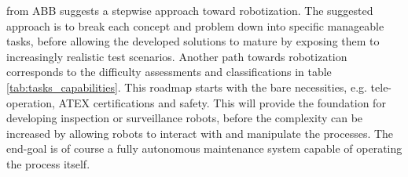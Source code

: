 \cite{StepwiseApproachToRobotics} from ABB suggests a stepwise approach toward robotization. The suggested approach is to break each concept and problem down into specific manageable tasks, before allowing the developed solutions to mature by exposing them to increasingly realistic test scenarios. Another path towards robotization corresponds to the difficulty assessments and classifications in table \ref{tab:tasks_capabilities}\cite{graf2008mobile}. This roadmap starts with the bare necessities, e.g. tele-operation, ATEX certifications and safety. This will provide the foundation for developing inspection or surveillance robots, before the complexity can be increased by allowing robots to interact with and manipulate the processes. The end-goal is of course a fully autonomous maintenance system capable of operating the process itself\cite{graf2008mobile}.




